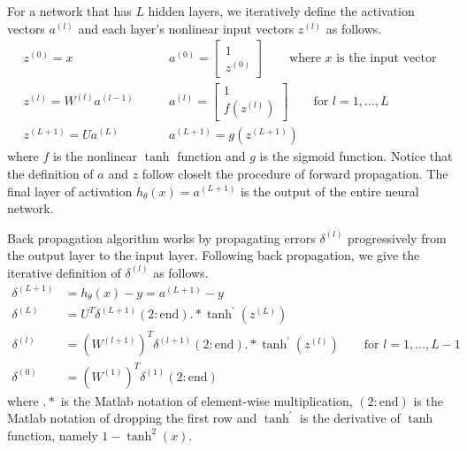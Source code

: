 \documentclass[letterpaper]{article}
\begin{document}
For a network that has $L$ hidden layers, we iteratively define the activation vectors $a^{(l)}$ and each layer's nonlinear input vectors $z^{(l)}$ as follows.
\begin{equation}\label{eq:activation}
\begin{split}
z^{(0)} = x
& \qquad 
a^{(0)} =
\begin{bmatrix}
1 \\ z^{(0)}
\end{bmatrix} 
\qquad
\textrm{where } x \textrm{ is the input vector} \\
z^{(l)} = W^{(l)} a^{(l-1)}
& \qquad
a^{(l)} = 
\begin{bmatrix}
1 \\ f(z^{(l)})
\end{bmatrix}
\qquad
\textrm{for } l = 1, \dots, L \\
z^{(L+1)} = U a^{(L)}
& \qquad
a^{(L+1)} = g(z^{(L+1)})
\end{split}
\end{equation}
where $f$ is the nonlinear $\tanh$ function and $g$ is the sigmoid function. Notice that the definition of $a$ and $z$ follow closelt the procedure of forward propagation. The final layer of activation $h_\theta(x) = a^{(L+1)}$ is the output of the entire neural network.

\vspace{0.1cm}

Back propagation algorithm works by propagating errors $\delta^{(l)}$ progressively from the output layer to the input layer. Following back propagation, we give the iterative definition of $\delta^{(l)}$ as follows.
\begin{equation}
\begin{split}
\delta^{(L+1)} &= h_\theta(x) - y = a^{(L+1)} - y \\
\delta^{(L)} &= U^T \delta^{(L+1)}(2:\textrm{end}).* \tanh^\prime (z^{(L)}) \\
\delta^{(l)} &= (W^{(l+1)})^T \delta^{(l+1)} (2:\textrm{end}) .* \tanh^\prime
(z^{(l)}) \qquad \textrm{for } l = 1, \dots, L-1 \\
\delta^{(0)} & = (W^{(1)})^T \delta^{(1)} (2:\textrm{end})
\end{split}
\end{equation}
where $.*$ is the Matlab notation of element-wise multiplication, $(2:\textrm{end})$ is the Matlab notation of dropping the first row and $\tanh^\prime$ is the derivative of $\tanh$ function, namely $1 - \tanh^2(x)$.

\vspace{0.1cm}
\end{document}
